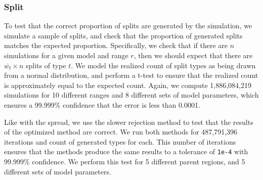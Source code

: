 \documentclass{article}
\begin{document}
\subsubsection{Split}

To test that the correct proportion of splits are generated by the simulation,
we simulate a sample of splits, and check that the proportion of generated
splits matches the expected proportion.
Specifically, we check that if there are \(n\) simulations for a given model
and range \( r \), then we should expect that there are \(\overline{w_t} \times
n\) splits of type \( t \).
We model the realized count of split types as being drawn from a normal
distribution, and perform a t-test to ensure that the realized count is
approximately equal to the expected count.
Again, we compute 1,886,084,219 simulations for 10 different ranges and 8
different sets of model parameters, which ensures a 99.999\% confidence that
the error is less than 0.0001.

Like with the spread, we use the slower rejection method to test that the
results of the optimized method are correct.
We run both methods for 487,791,396 iterations and count of generated types for
each.
This number of iterations ensures that the methods produce the same results to
a tolerance of \texttt{1e-4} with 99.999\% confidence.
We perform this test for 5 different parent regions, and 5 different sets of
model parameters.


\end{document}
